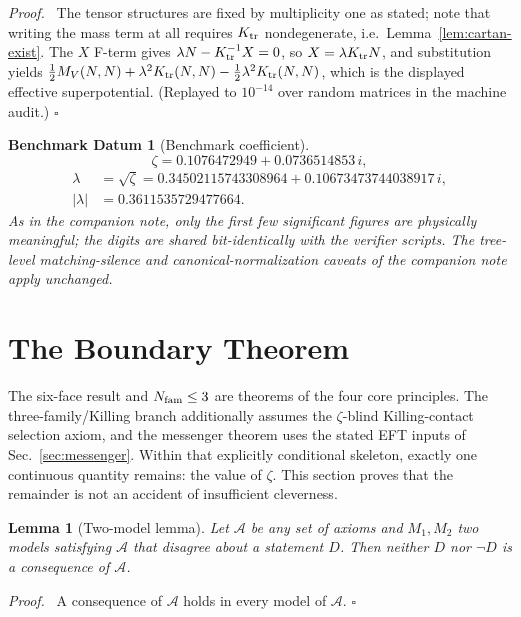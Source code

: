 \documentclass[
  aps,
  prd,
  preprint,
  nofootinbib,
  superscriptaddress,
  longbibliography
]{revtex4-2}
\newtheorem{lemma}[theorem]{Lemma}
\newtheorem{datum}[theorem]{Benchmark Datum}
\newenvironment{proof}{\par\noindent\textit{Proof.}\ }{\hfill\(\square\)\par}
\begin{document}
\begin{proof}
The tensor structures are fixed by multiplicity one as stated; note that
writing the mass term at all requires \(K_{\rm tr}\) nondegenerate, i.e.\
Lemma~\ref{lem:cartan-exist}.  The \(X\) F-term gives
\(\lambda N-K_{\rm tr}^{-1}X=0\), so \(X=\lambda K_{\rm tr}N\), and
substitution yields
\(\frac12 M_V(N,N)+\lambda^2K_{\rm tr}(N,N)
-\frac12\lambda^2K_{\rm tr}(N,N)\), which is the displayed effective
superpotential.  (Replayed to \(10^{-14}\) over random matrices in the
machine audit.)
\end{proof}

\begin{datum}[Benchmark coefficient]
\label{dat:zeta}
\[
  \zeta=0.1076472949+0.0736514853\,i,
\]
\[
  \begin{aligned}
  \lambda&=\sqrt{\zeta}
    =0.34502115743308964+0.10673473744038917\,i,\\
  |\lambda|&=0.3611535729477664 .
  \end{aligned}
\]
As in the companion note, only the first few significant figures are
physically meaningful; the digits are shared bit-identically with the
verifier scripts.  The tree-level matching-silence and
canonical-normalization caveats of the companion note apply unchanged.
\end{datum}

\section{The Boundary Theorem}
\label{sec:boundary}

The six-face result and \(N_{\rm fam}\le3\) are theorems of the four core
principles.  The three-family/Killing branch additionally assumes the
\(\zeta\)-blind Killing-contact selection axiom, and the messenger theorem
uses the stated EFT inputs of Sec.~\ref{sec:messenger}.  Within that
explicitly conditional skeleton, exactly one continuous quantity remains:
the value of \(\zeta\).  This section proves that the remainder is not an
accident of insufficient cleverness.

\begin{lemma}[Two-model lemma]
\label{lem:twomodel}
Let \(\mathcal A\) be any set of axioms and \(M_1,M_2\) two models
satisfying \(\mathcal A\) that disagree about a statement \(D\).  Then
neither \(D\) nor \(\neg D\) is a consequence of \(\mathcal A\).
\end{lemma}

\begin{proof}
A consequence of \(\mathcal A\) holds in every model of \(\mathcal A\).
\end{proof}
\end{document}
